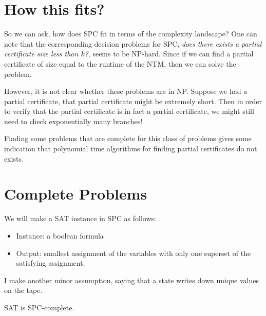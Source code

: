 \documentclass[runningheads,a4paper]{llncs}
\begin{document}
\section{How this fits?}

So we can ask, how does SPC fit in terms of the complexity landscape? One can note that the corresponding decision problems for SPC, \emph{does there exists a partial certificate size less than $k$?}, seems to be NP-hard. Since if we can find a partial certificate of size equal to the runtime of the NTM, then we can solve the problem.

However, it is not clear whether these problems are in NP. Suppose we had a partial certificate, that partial certificate might be extremely short. Then in order to verify that the partial certificate is in fact a partial certificate, we might still need to check exponentially many branches! 

Finding some problems that are complete for this class of problems gives some indication that polynomial time algorithms for finding partial certificates do not exists.

\section{Complete Problems}

We will make a SAT instance in SPC as follows:
\begin{itemize}
\item Instance: a boolean formula
\item Output: smallest assignment of the variables with only one superset of the satisfying assignment.
\end{itemize}

I make another minor assumption, saying that a state writes down unique values on the tape. 

\begin{theorem}
SAT is SPC-complete.
\end{theorem}
\end{document}
